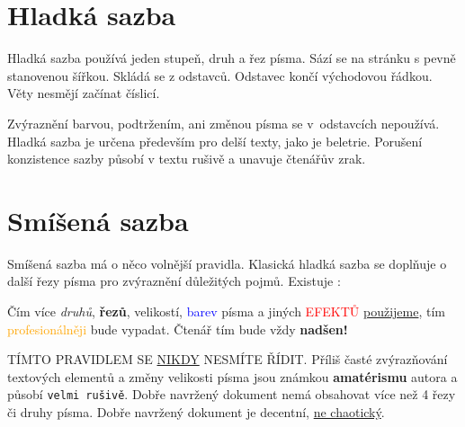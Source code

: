 \documentclass[a4paper, 10pt, twocolumn]{article}
\begin{document}

	\section{Hladká sazba}

	Hladká sazba používá jeden stupeň, druh a řez písma.
    Sází se na stránku s pevně stanovenou šířkou. Skládá se z odstavců. Odstavec končí východovou řádkou. Věty nesmějí začínat číslicí.

    Zvýraznění barvou, podtržením, ani změnou písma se v~odstavcích nepoužívá. Hladká sazba je určena především pro delší texty, jako je beletrie. Porušení konzistence sazby působí v textu rušivě a unavuje čtenářův zrak.

	\section{Smíšená sazba}
	\label{sec:smisenaVazba}

    Smíšená sazba má o něco volnější pravidla. Klasická hladká sazba se doplňuje o další řezy písma pro zvýraznění důležitých pojmů.
    Existuje :
    
    \begin{adjustwidth}{0.75cm}{0.60cm}
    \hspace{0.36cm}
    Čím více \emph{druhů}, \textbf{řezů}, {\huge velikostí}, \textcolor{blue} {barev} písma a jiných \textcolor{red}{\scriptsize EFEKTŮ} \underline{použijeme}, tím \textcolor{orange} {pro\-fe\-si\-o\-ná\-lně\-ji} bude \selectfont {\Large dokument} \selectfont vypadat. {\tiny Čtenář} tím bude vždy {\Huge \textbf{nadšen!}}
    \medskip
    \end{adjustwidth}
    
    \uppercase{{\footnotesize Tímto pravidlem se \underline{nikdy} nesmíte Řídit.}} Příliš časté zvýrazňování textových elementů a změny {\tiny velikosti} písma jsou známkou \textbf{amatérismu} autora a působí \texttt{velmi rušivě}. Dobře navržený dokument nemá obsahovat více než 4 řezy či druhy písma. Dobře navržený dokument je decentní, \underline{ne chaotický}. 
\end{document}

